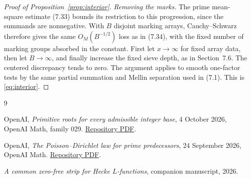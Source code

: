 \documentclass[11pt]{article}
\theoremstyle{remark}
\newcommand{\1}{\mathbf 1}
\begin{document}
\begin{proof}[Proof of Proposition~\ref{prop:interior}]
\emph{Removing the marks.}
The prime mean-square estimate (7.33) bounds its restriction to
this progression, since the summands are nonnegative.  With
$B$ disjoint marking arrays, Cauchy--Schwarz therefore gives
the same $O_M(B^{-1/2})$ loss as in (7.34), with the fixed
number of marking groups absorbed in the constant.  First
let $x\to\infty$ for fixed array data, then let $B\to\infty$,
and finally increase the fixed sieve depth, as in Section~7.6.
The centered discrepancy tends to zero.  The argument applies
to smooth one-factor tests by the same partial summation and
Mellin separation used in (7.1).  This is \eqref{eq:interior}.
\end{proof}

\begin{thebibliography}{9}

OpenAI,
\emph{Primitive roots for every admissible integer base},
4 October 2026, OpenAI Math, family 029.
\href{https://github.com/openai/math/blob/main/preprints/Primitive-roots-for-every-admissible-integer-base-October-4-2026/primitive-roots-all-integer-bases.pdf}{Repository PDF}.

OpenAI,
\emph{The Poisson--Dirichlet law for prime predecessors},
24 September 2026, OpenAI Math.
\href{https://github.com/openai/math/blob/main/preprints/The-Poisson-Dirichlet-Law-for-Prime-Predecessors-September-24-2026/paper.pdf}{Repository PDF}.

\emph{A common zero-free strip for Hecke $L$-functions},
companion manuscript, 2026.

\end{thebibliography}
\end{document}
